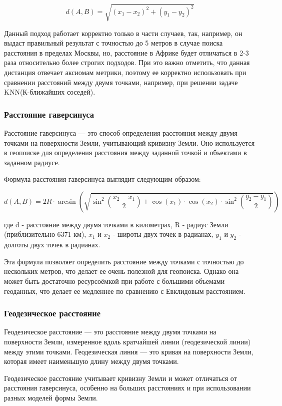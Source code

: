 $$
d(A, B)=\sqrt{(x_1-x_2)^2+(y_1-y_2)^2}
$$

Данный подход работает корректно только в части случаев, так, например, он выдаст правильный результат с точностью до 5 метров в случае поиска расстояния в пределах Москвы, но, расстояние в Африке будет отличаться в 2-3 раза относительно более строгих подходов.  
При это важно отметить, что данная дистанция отвечает аксиомам метрики, поэтому ее корректно использовать при сравнении расстояний между двумя точками, например, при решении задаче KNN(К-ближайших соседей). 

\subsubsection{Расстояние гаверсинуса}
Расстояние гаверсинуса — это способ определения расстояния между двумя точками на поверхности Земли, учитывающий кривизну Земли. Оно используется в геопоиске для определения расстояния между заданной точкой и объектами в заданном радиусе.

Формула расстояния гаверсинуса выглядит следующим образом:

$$
d(A, B) = 2R \cdot \arcsin\left(\sqrt{\sin^2\left(\frac{x_2-x_1}{2}\right) + \cos(x_1) \cdot \cos(x_2) \cdot \sin^2\left(\frac{y_2-y_1}{2}\right)}\right)
$$

где d - расстояние между двумя точками в километрах, R - радиус Земли (приблизительно 6371 км), $x_1$ и $x_2$ - широты двух точек в радианах, $y_1$ и $y_2$ - долготы двух точек в радианах.

Эта формула позволяет определить расстояние между точками с точностью до нескольких метров, что делает ее очень полезной для геопоиска. Однако она может быть достаточно ресурсоёмкой при работе с большими объемами геоданных, что делает ее медленнее по сравнению с Евклидовым расстоянием. 

\subsubsection{Геодезическое расстояние}
Геодезическое расстояние — это расстояние между двумя точками на поверхности Земли, измеренное вдоль кратчайшей линии (геодезической линии) между этими точками. Геодезическая линия — это кривая на поверхности Земли, которая имеет наименьшую длину между двумя точками.

Геодезическое расстояние учитывает кривизну Земли и может отличаться от расстояния гаверсинуса, особенно на больших расстояниях и при использовании разных моделей формы Земли.


